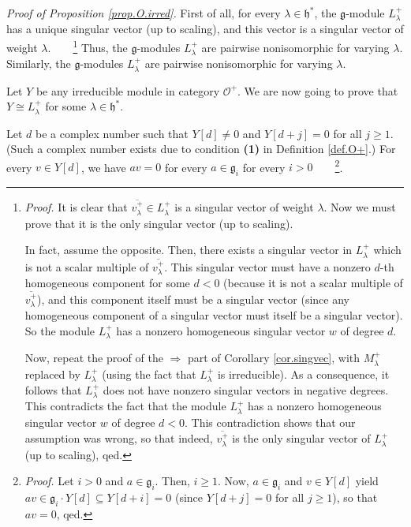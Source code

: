 \documentclass
[numbers=enddot,12pt,final,onecolumn,german,notitlepage]{scrartcl}%
\theoremstyle{definition}
\begin{document}
\textit{Proof of Proposition \ref{prop.O.irred}.} First of all, for every
$\lambda\in\mathfrak{h}^{\ast}$, the $\mathfrak{g}$-module $L_{\lambda}^{+}$
has a unique singular vector (up to scaling), and this vector is a singular
vector of weight $\lambda$.\ \ \ \ \footnote{\textit{Proof.} It is clear that
$\overline{v_{\lambda}^{+}}\in L_{\lambda}^{+}$ is a singular vector of weight
$\lambda$. Now we must prove that it is the only singular vector (up to
scaling).
\par
In fact, assume the opposite. Then, there exists a singular vector in
$L_{\lambda}^{+}$ which is not a scalar multiple of $\overline{v_{\lambda}%
^{+}}$. This singular vector must have a nonzero $d$-th homogeneous component
for some $d<0$ (because it is not a scalar multiple of $\overline{v_{\lambda
}^{+}}$), and this component itself must be a singular vector (since any
homogeneous component of a singular vector must itself be a singular vector).
So the module $L_{\lambda}^{+}$ has a nonzero homogeneous singular vector $w$
of degree $d$.
\par
Now, repeat the proof of the $\Longrightarrow$ part of Corollary
\ref{cor.singvec}, with $M_{\lambda}^{+}$ replaced by $L_{\lambda}^{+}$ (using
the fact that $L_{\lambda}^{+}$ is irreducible). As a consequence, it follows
that $L_{\lambda}^{+}$ does not have nonzero singular vectors in negative
degrees. This contradicts the fact that the module $L_{\lambda}^{+}$ has a
nonzero homogeneous singular vector $w$ of degree $d<0$. This contradiction
shows that our assumption was wrong, so that indeed, $\overline{v_{\lambda
}^{+}}$ is the only singular vector of $L_{\lambda}^{+}$ (up to scaling),
qed.} Thus, the $\mathfrak{g}$-modules $L_{\lambda}^{+}$ are pairwise
nonisomorphic for varying $\lambda$. Similarly, the $\mathfrak{g}$-modules
$L_{\lambda}^{+}$ are pairwise nonisomorphic for varying $\lambda$.

Let $Y$ be any irreducible module in category $\mathcal{O}^{+}$. We are now
going to prove that $Y\cong L_{\lambda}^{+}$ for some $\lambda\in
\mathfrak{h}^{\ast}$.

Let $d$ be a complex number such that $Y\left[  d\right]  \neq0$ and $Y\left[
d+j\right]  =0$ for all $j\geq1$. (Such a complex number exists due to
condition \textbf{(1)} in Definition \ref{def.O+}.) For every $v\in Y\left[
d\right]  $, we have $av=0$ for every $a\in\mathfrak{g}_{i}$ for every
$i>0$\ \ \ \ \footnote{\textit{Proof.} Let $i>0$ and $a\in\mathfrak{g}_{i}$.
Then, $i\geq1$. Now, $a\in\mathfrak{g}_{i}$ and $v\in Y\left[  d\right]  $
yield $av\in\mathfrak{g}_{i}\cdot Y\left[  d\right]  \subseteq Y\left[
d+i\right]  =0$ (since $Y\left[  d+j\right]  =0$ for all $j\geq1$), so that
$av=0$, qed.}.
\end{document}
